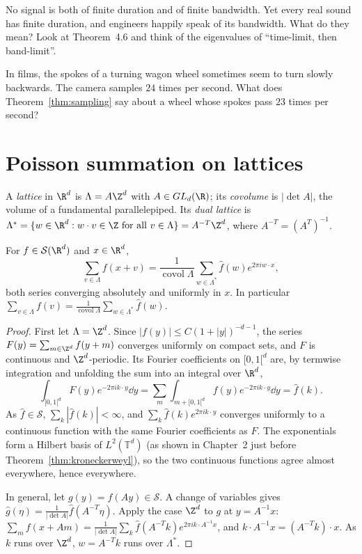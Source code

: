 \begin{think}
No signal is both of finite duration and of finite bandwidth. Yet every real sound has finite duration, and engineers happily speak of its bandwidth. What do they mean? Look at Theorem~4.6 and think of
the eigenvalues of ``time-limit, then band-limit''.
\end{think}

\begin{think}
In films, the spokes of a turning wagon wheel sometimes seem to turn slowly backwards. The camera samples $24$ times per second. What does Theorem~\ref{thm:sampling} say about a wheel whose spokes pass
$23$ times per second?
\end{think}

\section{Poisson summation on lattices}

A \emph{lattice} in $\R^d$ is $\Lambda=A\Z^d$ with $A\in GL_d(\R)$; its \emph{covolume} is $|\det A|$, the volume of a fundamental parallelepiped. Its \emph{dual lattice} is
$\Lambda^*=\{w\in\R^d:w\cdot v\in\Z\text{ for all }v\in\Lambda\}=A^{-T}\Z^d$, where $A^{-T}=(A^T)^{-1}$.

\begin{theorem}\label{thm:poissonlattice}
For $f\in\mathcal S(\R^d)$ and $x\in\R^d$,
\[\sum_{v\in\Lambda}f(x+v)=\frac1{\operatorname{covol}\Lambda}\sum_{w\in\Lambda^*}\hat f(w)e^{2\pi iw\cdot x},\]
both series converging absolutely and uniformly in $x$. In particular $\sum_{v\in\Lambda}f(v)=\frac1{\operatorname{covol}\Lambda}\sum_{w\in\Lambda^*}\hat f(w)$.
\end{theorem}
\begin{proof}
First let $\Lambda=\Z^d$. Since $|f(y)|\le C(1+|y|)^{-d-1}$, the series $F(y)=\sum_{m\in\Z^d}f(y+m)$ converges uniformly on compact sets, and $F$ is continuous and $\Z^d$-periodic. Its Fourier coefficients on $[0,1[^d$ are, by
termwise integration and unfolding the sum into an integral over $\R^d$,
\[\int_{[0,1[^d}F(y)e^{-2\pi ik\cdot y}\dd y=\sum_m\int_{m+[0,1[^d}f(y)e^{-2\pi ik\cdot y}\dd y=\hat f(k).\]
As $\hat f\in\mathcal S$, $\sum_k|\hat f(k)|<\infty$, and $\sum_k\hat f(k)e^{2\pi ik\cdot y}$ converges uniformly to a continuous function with the same Fourier coefficients as $F$. The exponentials form a Hilbert basis of
$L^2(\mathbb T^d)$ (as shown in Chapter~2 just before Theorem~\ref{thm:kroneckerweyl}), so the two continuous functions agree almost everywhere, hence everywhere.

In general, let $g(y)=f(Ay)\in\mathcal S$. A change of variables gives $\hat g(\eta)=\frac1{|\det A|}\hat f(A^{-T}\eta)$. Apply the case $\Z^d$ to $g$ at $y=A^{-1}x$: $\sum_mf(x+Am)=\frac1{|\det A|}\sum_k\hat f(A^{-T}k)e^{2\pi ik\cdot A^{-1}x}$,
and $k\cdot A^{-1}x=(A^{-T}k)\cdot x$. As $k$ runs over $\Z^d$, $w=A^{-T}k$ runs over $\Lambda^*$.
\end{proof}

